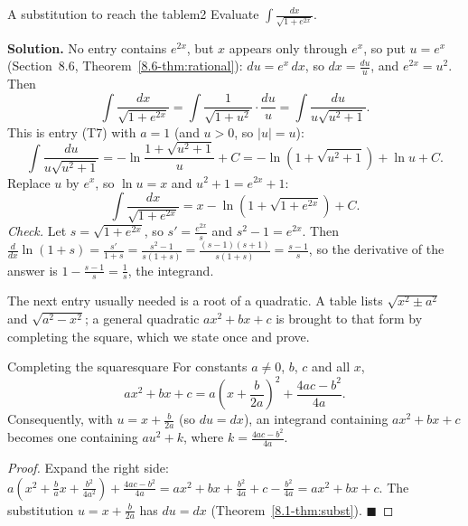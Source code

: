 \documentclass[11pt]{article}
\begin{document}
\begin{exmp}{A substitution to reach the table}{m2}
Evaluate $\displaystyle\int\frac{dx}{\sqrt{1+e^{2x}}}$.

\textbf{Solution.} No entry contains $e^{2x}$, but $x$ appears only through $e^x$, so put $u=e^x$ (Section~8.6, Theorem~\ref{8.6-thm:rational}): $du=e^x\,dx$, so $dx=\frac{du}u$, and $e^{2x}=u^2$. Then
\[\int\frac{dx}{\sqrt{1+e^{2x}}}=\int\frac{1}{\sqrt{1+u^2}}\cdot\frac{du}u=\int\frac{du}{u\sqrt{u^2+1}} .\]
This is entry (T7) with $a=1$ (and $u>0$, so $\lvert u\rvert=u$):
\[\int\frac{du}{u\sqrt{u^2+1}}=-\ln\frac{1+\sqrt{u^2+1}}{u}+C=-\ln\left(1+\sqrt{u^2+1}\right)+\ln u+C .\]
Replace $u$ by $e^x$, so $\ln u=x$ and $u^2+1=e^{2x}+1$:
\[\int\frac{dx}{\sqrt{1+e^{2x}}}=x-\ln\left(1+\sqrt{1+e^{2x}}\right)+C .\]
\emph{Check.} Let $s=\sqrt{1+e^{2x}}$, so $s'=\frac{e^{2x}}s$ and $s^2-1=e^{2x}$. Then $\frac d{dx}\ln(1+s)=\frac{s'}{1+s}=\frac{s^2-1}{s(1+s)}=\frac{(s-1)(s+1)}{s(1+s)}=\frac{s-1}s$, so the derivative of the answer is $1-\frac{s-1}s=\frac1s$, the integrand.
\end{exmp}

The next entry usually needed is a root of a quadratic. A table lists $\sqrt{x^2\pm a^2}$ and $\sqrt{a^2-x^2}$; a general quadratic $ax^2+bx+c$ is brought to that form by completing the square, which we state once and prove.

\begin{thm}{Completing the square}{square}
For constants $a\ne0$, $b$, $c$ and all $x$,
\[ax^2+bx+c=a\left(x+\frac b{2a}\right)^2+\frac{4ac-b^2}{4a}.\]
Consequently, with $u=x+\frac b{2a}$ (so $du=dx$), an integrand containing $ax^2+bx+c$ becomes one containing $au^2+k$, where $k=\frac{4ac-b^2}{4a}$.
\end{thm}
\begin{proof}
Expand the right side: $a\left(x^2+\frac bax+\frac{b^2}{4a^2}\right)+\frac{4ac-b^2}{4a}=ax^2+bx+\frac{b^2}{4a}+c-\frac{b^2}{4a}=ax^2+bx+c$. The substitution $u=x+\frac b{2a}$ has $du=dx$ (Theorem~\ref{8.1-thm:subst}). $\blacksquare$
\end{proof}
\end{document}
